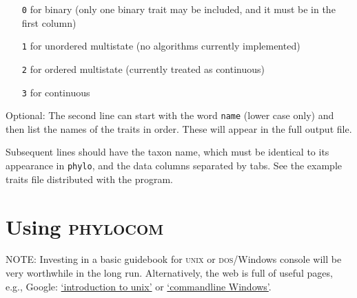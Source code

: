 \documentclass[12pt,letterpaper]{article}
\begin{document}
\begin{itemize}
\item[\texttt{0}] for binary (only one binary trait may be included, and it must be in the first column)
\item[\texttt{1}] for unordered multistate (no algorithms currently implemented)
\item[\texttt{2}] for ordered multistate (currently treated as continuous)
\item[\texttt{3}] for continuous
\end{itemize}

Optional: The second line can start with the word \verb|name| (lower case
only) and then list the names of the traits in order. These will
appear in the full output file.

Subsequent lines should have the taxon name, which must be identical
to its appearance in \verb|phylo|, and the data columns separated by
tabs. See the example traits file distributed with the program.

\section{Using {\scshape phylocom}}
\label{s:usingphylocom}

NOTE: Investing in a basic guidebook for {\scshape unix} or {\scshape
  dos}/Windows console will be very worthwhile in the long run.
Alternatively, the web is full of useful pages, e.g., Google:
\href{http://www.google.com/search?q=introduction+to+unix}{`introduction to
  unix'} or
\href{http://www.google.com/search?q=commandline+Windows}{`commandline
  Windows'}.
\end{document}
